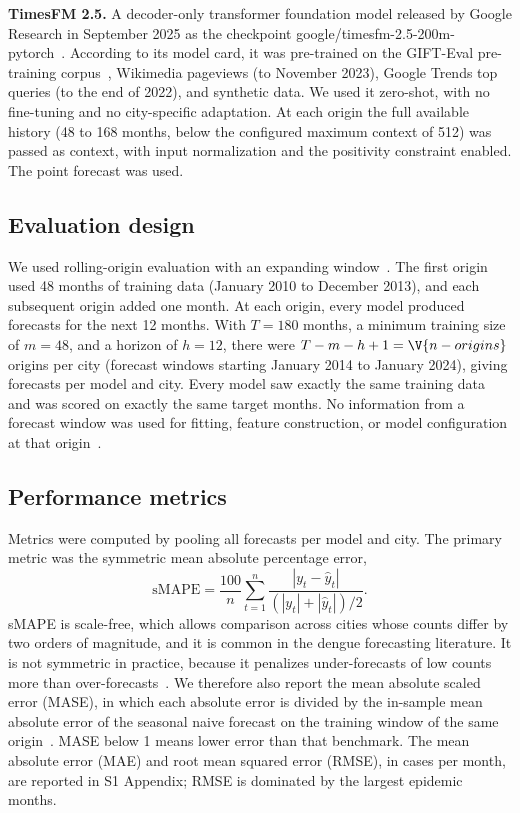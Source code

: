 \documentclass[10pt,letterpaper]{article}
\begin{document}
\textbf{TimesFM 2.5.} A decoder-only transformer foundation model released by Google Research in September 2025 as the checkpoint google/timesfm-2.5-200m-pytorch~\cite{Das2024timesfm,TimesFM25card}. According to its model card, it was pre-trained on the GIFT-Eval pre-training corpus~\cite{Aksu2024gifteval}, Wikimedia pageviews (to November 2023), Google Trends top queries (to the end of 2022), and synthetic data. We used it zero-shot, with no fine-tuning and no city-specific adaptation. At each origin the full available history (48 to 168 months, below the configured maximum context of 512) was passed as context, with input normalization and the positivity constraint enabled. The point forecast was used.

\subsection*{Evaluation design}
We used rolling-origin evaluation with an expanding window~\cite{Tashman2000,Hewamalage2023}. The first origin used 48 months of training data (January 2010 to December 2013), and each subsequent origin added one month. At each origin, every model produced forecasts for the next 12 months. With $T = 180$ months, a minimum training size of $m = 48$, and a horizon of $h = 12$, there were $T - m - h + 1 = \V{n-origins}$ origins per city (forecast windows starting January 2014 to January 2024), giving  forecasts per model and city. Every model saw exactly the same training data and was scored on exactly the same target months. No information from a forecast window was used for fitting, feature construction, or model configuration at that origin~\cite{Kapoor2023}.

\subsection*{Performance metrics}
Metrics were computed by pooling all  forecasts per model and city. The primary metric was the symmetric mean absolute percentage error,
\begin{equation}
\mathrm{sMAPE} = \frac{100}{n}\sum_{t=1}^{n}\frac{|y_t-\hat{y}_t|}{(|y_t|+|\hat{y}_t|)/2}.
\end{equation}
sMAPE is scale-free, which allows comparison across cities whose counts differ by two orders of magnitude, and it is common in the dengue forecasting literature. It is not symmetric in practice, because it penalizes under-forecasts of low counts more than over-forecasts~\cite{Hewamalage2023}. We therefore also report the mean absolute scaled error (MASE), in which each absolute error is divided by the in-sample mean absolute error of the seasonal naive forecast on the training window of the same origin~\cite{HyndmanKoehler2006}. MASE below 1 means lower error than that benchmark. The mean absolute error (MAE) and root mean squared error (RMSE), in cases per month, are reported in S1 Appendix; RMSE is dominated by the largest epidemic months.
\end{document}
